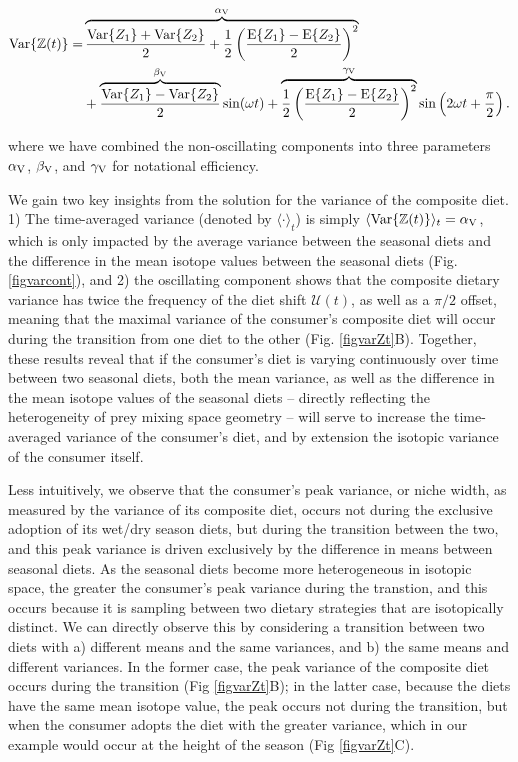 \documentclass{frontiersSCNS}
\begin{document}
\begin{align}
  \begin{split}
  \label{eqZtsin}
    {\rm Var}\{\mathbb{Z}(t)\} = &\overbrace{\frac{{\rm Var}\{Z_1\} + {\rm Var}\{Z_2\}}{2} + \frac{1}{2} \left(\frac{{\rm E}\{Z_1\} - {\rm E}\{Z_2\}}{2}\right)^2}^{\alpha_{\rm V}} \\
    &+ \overbrace{\frac{{\rm Var}\{Z_1\} - {\rm Var}\{Z_2\}}{2}}^{\beta_{\rm V}}\sin(\omega t) + \overbrace{\frac{1}{2}\left(\frac{{\rm E}\{Z_1\} - {\rm E}\{Z_2\}}{2}\right)^2}^{\gamma_{\rm V}}\sin\left(2\omega t + \frac{\pi}{2}\right).
  \end{split}
\end{align}

\noindent where we have combined the non-oscillating components into three parameters $\alpha_{\rm V}$, $\beta_{\rm V}$, and $\gamma_{\rm V}$ for notational efficiency.

We gain two key insights from the solution for the variance of the composite diet.
1) The time-averaged variance (denoted by $\langle \cdot
\rangle_t$) is simply $\langle {\rm Var}\{\mathbb{Z}(t)\} \rangle_t = \alpha_{\rm V}$, which is only impacted by the average variance between the seasonal diets and the difference in the mean isotope values between the seasonal diets (Fig. \ref{figvarcont}), and
2) the oscillating component shows that the composite dietary variance has twice the frequency of the diet shift $\mathcal{U}(t)$, as well as a $\pi/2$ offset, meaning that the maximal variance of the consumer's composite diet will occur during the transition from one diet to the other (Fig. \ref{figvarZt}B).
Together, these results reveal that if the consumer's diet is varying continuously over time between two seasonal diets, both the mean variance, as well as the difference in the mean isotope values of the seasonal diets -- directly reflecting the heterogeneity of prey mixing space geometry -- will serve to increase the time-averaged variance of the consumer's diet, and by extension the isotopic variance of the consumer itself.

Less intuitively, we observe that the consumer's peak variance, or niche width, as measured by the variance of its composite diet, occurs not during the exclusive adoption of its wet/dry season diets, but during the transition between the two, and this peak variance is driven exclusively by the difference in means between seasonal diets.
As the seasonal diets become more heterogeneous in isotopic space, the greater the consumer's peak variance during the transtion, and this occurs because it is sampling between two dietary strategies that are isotopically distinct.
We can directly observe this by considering a transition between two diets with  a) different means and the same variances, and b) the same means and different variances.
In the former case, the peak variance of the composite diet occurs during the transition (Fig \ref{figvarZt}B); in the latter case, because the diets have the same mean isotope value, the peak occurs not during the transition, but when the consumer adopts the diet with the greater variance, which in our example would occur at the height of the season (Fig \ref{figvarZt}C).
\end{document}

